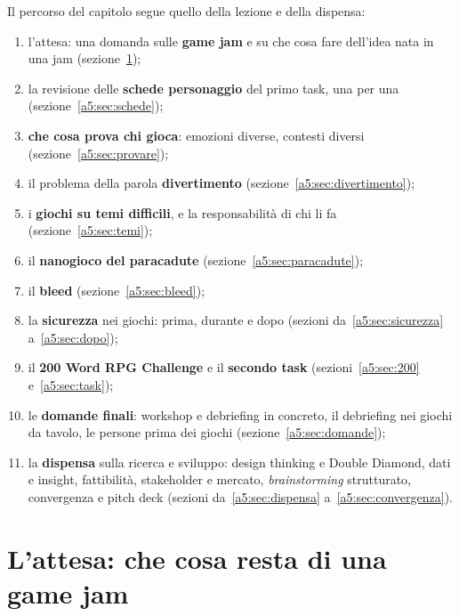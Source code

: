Il percorso del capitolo segue quello della lezione e della dispensa:
\begin{enumerate}
  \item l'attesa: una domanda sulle \textbf{game jam} e su che cosa fare
        dell'idea nata in una jam (sezione~\ref{a5:sec:attesa});
  \item la revisione delle \textbf{schede personaggio} del primo task, una per
        una (sezione~\ref{a5:sec:schede});
  \item \textbf{che cosa prova chi gioca}: emozioni diverse, contesti diversi
        (sezione~\ref{a5:sec:provare});
  \item il problema della parola \textbf{divertimento}
        (sezione~\ref{a5:sec:divertimento});
  \item i \textbf{giochi su temi difficili}, e la responsabilità di chi li fa
        (sezione~\ref{a5:sec:temi});
  \item il \textbf{nanogioco del paracadute} (sezione~\ref{a5:sec:paracadute});
  \item il \textbf{bleed} (sezione~\ref{a5:sec:bleed});
  \item la \textbf{sicurezza} nei giochi: prima, durante e dopo
        (sezioni da~\ref{a5:sec:sicurezza} a~\ref{a5:sec:dopo});
  \item il \textbf{200 Word RPG Challenge} e il \textbf{secondo task}
        (sezioni~\ref{a5:sec:200} e~\ref{a5:sec:task});
  \item le \textbf{domande finali}: workshop e debriefing in concreto, il
        debriefing nei giochi da tavolo, le persone prima dei giochi
        (sezione~\ref{a5:sec:domande});
  \item la \textbf{dispensa} sulla ricerca e sviluppo: design thinking e Double
        Diamond, dati e insight, fattibilità, stakeholder e mercato,
        \emph{brainstorming} strutturato, convergenza e pitch deck (sezioni
        da~\ref{a5:sec:dispensa} a~\ref{a5:sec:convergenza}).
\end{enumerate}

\section{L'attesa: che cosa resta di una game jam}
\label{a5:sec:attesa}

